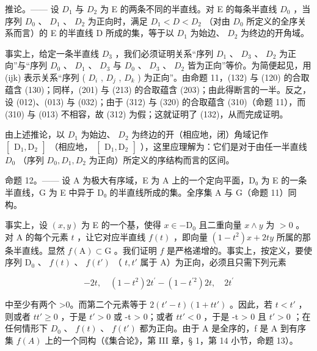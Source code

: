 推论。—— 设 \(D_{1}\) 与 \(D_{2}\) 为 E 的两条不同的半直线。对 E 的每条半直线 \(D_{0}\) ，当序列 \(D_{0}\) 、 \(D_{1}\) 、 \(D_{2}\) 为正向时，满足 \(D_{1} < D < D_{2}\) （对由 \(D_{0}\) 所定义的全序关系而言）的 E 的半直线 D 所成的集，等于以 \(D_{1}\) 为始边、 \(D_{2}\) 为终边的开角域。

事实上，给定一条半直线 \(D_{3}\) ，我们必须证明关系“序列 \(D_{1}\) 、 \(D_{3}\) 、 \(D_{2}\) 为正向”与“序列 \(D_{0}\) 、 \(D_{1}\) 、 \(D_{3}\) 与 \(D_{0}\) 、 \(D_{3}\) 、 \(D_{2}\) 皆为正向”等价。为简便起见，用 (ijk) 表示关系“序列 ( \(D_{i}\) , \(D_{j}\) , \(D_{k}\) ) 为正向”。由命题 11，(132) 与 (120) 的合取蕴含 (130)；同样，(201) 与 (213) 的合取蕴含 (203)；由此得断言的一半。反之，设 (012)、(013) 与 (032)；由于 (312) 与 (320) 的合取蕴含 (310)（命题 11），而 (310) 与 (013) 不相容，故 (312) 为假；这就证明了 (132)，从而完成证明。

由上述推论，以 \(D_{1}\) 为始边、 \(D_{2}\) 为终边的开（相应地，闭）角域记作 \(\left[\begin{matrix}\mathrm{D}_{1},\mathrm{D}_{2}\end{matrix}\right]\) （相应地， \(\left[\begin{matrix}\mathrm{D}_{1},\mathrm{D}_{2}\end{matrix}\right]\) ），这里应理解为：它们是对于由任一半直线 \(D_{0}\) （序列 \(D_{0},D_{1},D_{2}\) 为正向）所定义的序结构而言的区间。

命题 12。—— 设 A 为极大有序域，E 为 A 上的一个定向平面，D₀ 为 E 的一条半直线，G 为 E 中异于 D₀ 的半直线所成的集。全序集 A 与 G（命题 11）同构。

事实上，设 \((x, y)\) 为 E 的一个基，使得 \(x \in -\mathrm{D}_{0}\) 且二重向量 \(x \wedge y\) 为 \(> 0\) 。对 A 的每个元素 \(t\) ，让它对应半直线 \(f(t)\) ，即向量 \((1 - t^{2})x + 2ty\) 所属的那条半直线。显然 \(f(\mathrm{A}) \subset \mathrm{G}\) 。我们证明 \(f\) 是严格递增的。事实上，按定义，要使序列 \(\mathrm{D}_{0}\) 、 \(f(t)\) 、 \(f(t')\) （ \(t, t'\) 属于 A）为正向，必须且只需下列元素

\[
- 2 t, \quad (1 - t ^ {2}) 2 t ^ {\prime} - (1 - t ^ {\prime 2}) 2 t, \quad 2 t ^ {\prime}
\]

中至少有两个 \textgreater0。而第二个元素等于 \(2(t' - t)(1 + tt')\) 。因此，若 \(t < t'\) ，则或者 \(tt' \geqslant 0\) ，于是 \(t' > 0\) 或 -t \textgreater{} 0；或者 \(tt' < 0\) ，于是 -t \textgreater{} 0 且 \(t' > 0\) ；在任何情形下 \(D_{0}\) 、 \(f(t)\) 、 \(f(t')\) 都为正向。由于 A 是全序的，f 是 A 到有序集 \(f(A)\) 上的一个同构（《集合论》，第 III 章，§ 1，第 14 小节，命题 13）。


